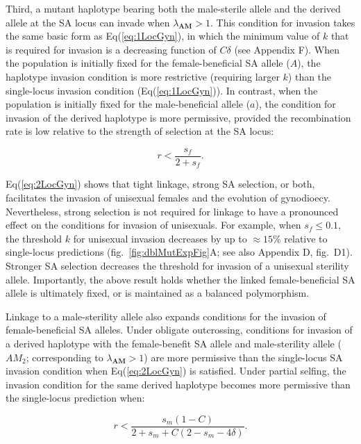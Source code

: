 \documentclass{article}
\begin{document}
Third, a mutant haplotype bearing both the male-sterile allele and the derived allele at the SA locus can invade when $\lambda_{\mathbf{AM}} > 1$. This condition for invasion takes the same basic form as Eq(\ref{eq:1LocGyn}), in which the minimum value of $k$ that is required for invasion is a decreasing function of $C \delta$ (see Appendix F). When the population is initially fixed for the female-beneficial SA allele ($A$), the haplotype invasion condition is more restrictive (requiring larger $k$) than the single-locus invasion condition (Eq(\ref{eq:1LocGyn})). In contrast, when the population is initially fixed for the male-beneficial allele ($a$), the condition for invasion of the derived haplotype is more permissive, provided the recombination rate is low relative to the strength of selection at the SA locus: 

\begin{equation}\label{eq:2LocGyn}
	r < \frac{s_f}{2 + s_f}.
\end{equation}

\noindent Eq(\ref{eq:2LocGyn}) shows that tight linkage, strong SA selection, or both, facilitates the invasion of unisexual females and the evolution of gynodioecy. Nevertheless, strong selection is not required for linkage to have a pronounced effect on the conditions for invasion of unisexuals. For example, when $s_f \leq 0.1$, the threshold $k$ for unisexual invasion decreases by up to $\approx 15 \%$ relative to single-locus predictions (fig.~\ref{fig:dblMutExpFig}A; see also Appendix D, fig.~D1). Stronger SA selection decreases the threshold for invasion of a unisexual sterility allele. Importantly, the above result holds whether the linked female-beneficial SA allele is ultimately fixed, or is maintained as a balanced polymorphism.

Linkage to a male-sterility allele also expands conditions for the invasion of female-beneficial SA alleles. Under obligate outcrossing, conditions for invasion of a derived haplotype with the female-benefit SA allele and male-sterility allele ($AM_2$; corresponding to $\lambda_{\mathbf{AM}} > 1$) are more permissive than the single-locus SA invasion condition when Eq(\ref{eq:2LocGyn}) is satisfied. Under partial selfing, the invasion condition for the same derived haplotype becomes more permissive than the single-locus prediction when:

\begin{equation}\label{eq:2LocGynSApartSelf}
	r < \frac{s_m (1 - C)}{2 + s_m + C (2 - s_m - 4 \delta)}.
\end{equation}
\end{document}

